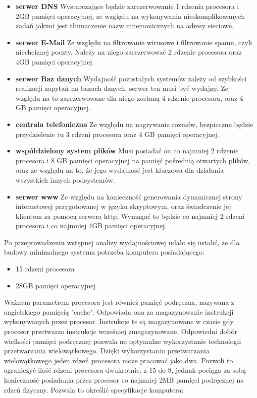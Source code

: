 				\begin{itemize}	
						\item{\textbf{serwer DNS}} Wystarczające będzie zarezerwowanie 1 rdzenia procesora i 2GB pamięci operacyjnej, ze względu na wykonywania nieskomplikowanych zadań jakimi jest tłumaczenie nazw mnemonicznych na adresy sieciowe.
						
						\item{\textbf{serwer E-Mail}} Ze względu na filtrowanie wirusowe i filtrowanie spamu, czyli niechcianej poczty. Należy na niego zarezerwować 2 rdzenie procesora oraz 4GB pamięci operacyjnej.
						
						\item{\textbf{serwer Baz danych}} Wydajność pozostałych systemów zależy od szybkości realizacji zapytań na bazach danych, serwer ten musi być wydajny. Ze względu na to zarezerwowane dla niego zostaną 4 rdzenie procesora, oraz 4 GB pamięci operacyjnej.
						
						\item{\textbf{centrala telefoniczna}} Ze względu na nagrywanie rozmów, bezpieczne będzie przydzielenie tu 3 rdzeni procesora oraz 4 GB pamięci operacyjnej. 
						
						\item{\textbf{współdzielony system plików}} Musi posiadać on co najmniej 2 rdzenie procesora i 8 GB pamięci operacyjnej na pamięć pośrednią otwartych plików, oraz ze względu na to, że jego wydajność jest kluczowa dla działania wszystkich innych podsystemów.
						
						\item{\textbf{serwer www}}  Ze względu na konieczność generowania dynamicznej strony internetowej przygotowanej w języku skryptowym, oraz świadczenie jej klientom za pomocą serwera http. Wymagać to będzie co najmniej 2 rdzeni procesora i co najmniej 4GB pamięci operacyjnej.
					
					\end{itemize}	
			
					Po przeprowadzeniu wstępnej analizy wydajnościowej udało się ustalić, że dla budowy minimalnego systemu potrzeba komputera posiadającego:
			
					\begin{itemize}
						\item 15 rdzeni procesora
						\item 28GB pamięci operacyjnej
					\end{itemize}
			
					\par Ważnym parametrem procesora jest również pamięć podręczna, nazywana z angielskiego pamięcią "cache". Odpowiada ona za magazynowanie instrukcji wykonywanych przez procesor. Instrukcje te są magazynowane w czasie gdy procesor przetwarza instrukcje wcześniej zmagazynowane. Odpowiedni dobór wielkości pamięci podręcznej pozwala na optymalne wykorzystanie technologii przetwarzania wielowątkowego. Dzięki wykorzystaniu przetwarzania wielowątkowego jeden rdzeń procesora może pracować jako dwa. Pozwoli to ograniczyć ilość rdzeni procesora dwukrotnie, z 15 do 8, jednak pociąga za sobą konieczność posiadania przez procesor co najmniej 2MB pamięci podręcznej na rdzeń fizyczny. Pozwala to określić specyfikacje komputera:
			
